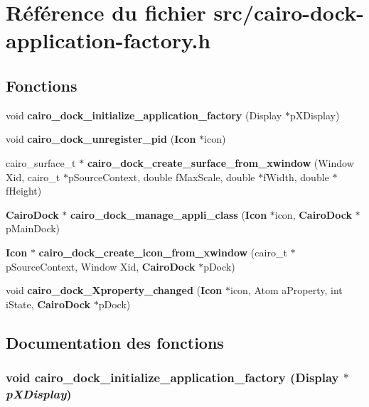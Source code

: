 \section{Référence du fichier src/cairo-dock-application-factory.h}
\label{cairo-dock-application-factory_8h}
\subsection*{Fonctions}
\begin{CompactItemize}
\item 
void {\bf cairo\_\-dock\_\-initialize\_\-application\_\-factory} (Display $\ast$pXDisplay)
\item 
void {\bf cairo\_\-dock\_\-unregister\_\-pid} ({\bf Icon} $\ast$icon)
\item 
cairo\_\-surface\_\-t $\ast$ {\bf cairo\_\-dock\_\-create\_\-surface\_\-from\_\-xwindow} (Window Xid, cairo\_\-t $\ast$pSourceContext, double fMaxScale, double $\ast$fWidth, double $\ast$fHeight)
\item 
{\bf CairoDock} $\ast$ {\bf cairo\_\-dock\_\-manage\_\-appli\_\-class} ({\bf Icon} $\ast$icon, {\bf CairoDock} $\ast$pMainDock)
\item 
{\bf Icon} $\ast$ {\bf cairo\_\-dock\_\-create\_\-icon\_\-from\_\-xwindow} (cairo\_\-t $\ast$pSourceContext, Window Xid, {\bf CairoDock} $\ast$pDock)
\item 
void {\bf cairo\_\-dock\_\-Xproperty\_\-changed} ({\bf Icon} $\ast$icon, Atom aProperty, int iState, {\bf CairoDock} $\ast$pDock)
\end{CompactItemize}


\subsection{Documentation des fonctions}
\subsubsection{\setlength{\rightskip}{0pt plus 5cm}void cairo\_\-dock\_\-initialize\_\-application\_\-factory (Display $\ast$ {\em pXDisplay})}\label{cairo-dock-application-factory_8h_678ef395cc28e3a8fa07ba22577f6bf7}


